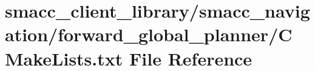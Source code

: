 \hypertarget{smacc__client__library_2smacc__navigation_2forward__global__planner_2CMakeLists_8txt}{}\section{smacc\+\_\+client\+\_\+library/smacc\+\_\+navigation/forward\+\_\+global\+\_\+planner/\+C\+Make\+Lists.txt File Reference}
\label{smacc__client__library_2smacc__navigation_2forward__global__planner_2CMakeLists_8txt}
